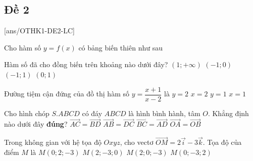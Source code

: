 \subsection{Đề 2}
[ans/OTHK1-DE2-LC]
\caulc
\begin{ex}%
	Cho hàm số $y=f(x)$ có bảng biến thiên như sau
	\begin{center}
	\end{center}
	Hàm số đã cho đồng biến trên khoảng nào dưới đây?
	\choice
	{$(1;+\infty)$}
	{$(-1;0)$}
	{$(-1;1)$}
	{\True $(0;1)$}
\end{ex}

\begin{ex}%
	Đường tiệm cận đứng của đồ thị hàm số $y=\dfrac{x+1}{x-2}$ là
	\choice
	{$y=2$}
	{\True $x=2$}
	{$y=1$}
	{$x=1$}
\end{ex}

\begin{ex}%
	Cho hình chóp $S.ABCD$ có đáy $ABCD$ là hình bình hành, tâm $O$. Khẳng định nào dưới đây \textbf{đúng}?
	\choice
	{$\overrightarrow{AC}=\overrightarrow{BD}$}
	{$\overrightarrow{AB}=\overrightarrow{DC}$}
	{\True $\overrightarrow{BC}=\overrightarrow{AD}$}
	{$\overrightarrow{OA}=\overrightarrow{OB}$}
\end{ex}

\begin{ex}%
	Trong không gian với hệ tọa độ $Oxyz$, cho vectơ $\overrightarrow{OM}=2\overrightarrow{i}-3\overrightarrow{k}$. Tọa độ của điểm $M$ là
	\choice
	{$M(0;2;-3)$}
	{$M(2;-3;0)$}
	{\True $M(2;0;-3)$}
	{$M(0;-3;2)$}
\end{ex}

